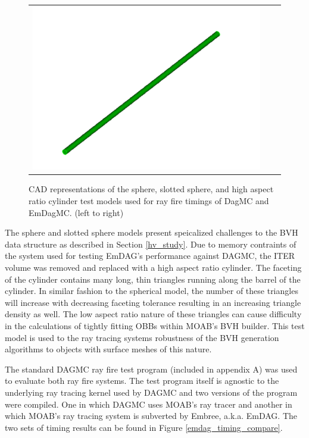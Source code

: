 \documentclass[12pt, a4paper]{article}
\begin{document}
\begin{figure}[H]
\begin{center}
\begin{tabular}{ccc}
      \includegraphics[scale=0.13]{larcyl.png} \\
    \end{tabular}
    \caption{CAD representations of the sphere, slotted sphere, and high aspect ratio cylinder test models used for ray fire timings of DagMC and EmDagMC. (left to right) \label{models}}
  \end{center}
\end{figure} 


The sphere and slotted sphere models present speicalized challenges to the BVH data structure as described in Section \ref{hv_study}. Due to memory contraints of the system used for testing EmDAG's performance against DAGMC, the ITER volume was removed and replaced with a high aspect ratio cylinder. The faceting of the cylinder contains many long, thin triangles running along the barrel of the cylinder. In similar fashion to the spherical model, the number of these triangles will increase with decreasing faceting tolerance resulting in an increasing triangle density as well. The low aspect ratio nature of these triangles can cause difficulty in the calculations of tightly fitting OBBs within MOAB's BVH builder. This test model is used to the ray tracing systems robustness of the BVH generation algorithms to objects with surface meshes of this nature.

The standard DAGMC ray fire test program (included in appendix A) was used to evaluate both ray fire systems. The test program itself is agnostic to the underlying ray tracing kernel used by DAGMC and two versions of the program were compiled. One in which DAGMC uses MOAB's ray tracer and another in which MOAB's ray tracing system is subverted by Embree, a.k.a. EmDAG. The two sets of timing results can be found in Figure \ref{emdag_timing_compare}.
\end{document}
